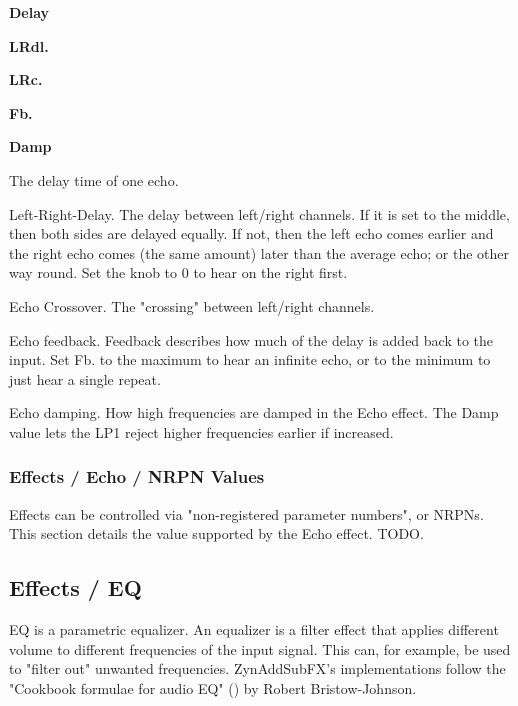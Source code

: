    \begin{enumber}
      \item \textbf{Delay}
      \item \textbf{LRdl.}
      \item \textbf{LRc.}
      \item \textbf{Fb.}
      \item \textbf{Damp}
   \end{enumber}

   \setcounter{ItemCounter}{0}      %

   The delay time of one echo.

   Left-Right-Delay.
   The delay between left/right channels.
   If it is set to the middle, then both sides are delayed equally. If
   not, then the left echo comes earlier and the right echo comes (the
   same amount) later than the average echo; or the other way round.
   Set the knob to 0 to hear on the right first.

   Echo Crossover.
   The "crossing" between left/right channels.

   Echo feedback.
   Feedback describes how much of the delay is added back to the input.
   Set Fb. to the maximum to hear an infinite echo, or to the minimum to
   just hear a single repeat.

   Echo damping.
   How high frequencies are damped in the Echo effect.
   The Damp value lets the LP1 reject higher frequencies earlier if
   increased.

\subsubsection{Effects / Echo / NRPN Values}
\label{subsubsec:effects_edit_echo_nrpn}

   Effects can be controlled via "non-registered parameter numbers", or NRPNs.
   This section details the value supported by the Echo effect.  TODO.

\subsection{Effects / EQ}
\label{subsec:effects_edit_eq}

   EQ is a parametric equalizer.
   An equalizer is a filter effect that applies different volume to different
   frequencies of the input signal. This can, for example, be used to "filter
   out" unwanted frequencies. ZynAddSubFX’s implementations follow the
   "Cookbook formulae for audio EQ" (\cite{cookbookeq})
   by Robert Bristow-Johnson.

